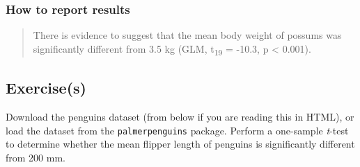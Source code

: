 \documentclass[
  letterpaper,
  DIV=11,
  numbers=noendperiod]{scrartcl}
\begin{document}
\subsubsection{How to report results}\label{how-to-report-results-1}

\begin{quote}
There is evidence to suggest that the mean body weight of possums was
significantly different from 3.5 kg (GLM, t\textsubscript{19} = -10.3, p
\textless{} 0.001).
\end{quote}

\subsection{Exercise(s)}\label{exercises}

Download the penguins dataset (from below if you are reading this in
HTML), or load the dataset from the \texttt{palmerpenguins} package.
Perform a one-sample \emph{t}-test to determine whether the mean flipper
length of penguins is significantly different from 200 mm.
\end{document}
